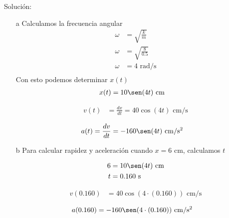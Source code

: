 \documentclass[letterpaper,12pt,addpoints]{exam}
\begin{document}
{\color{ceruleanblue}
Solución:\\
\begin{enumerate}
\item[a] Calculamos la frecuencia angular
\begin{align*}
\omega &= \sqrt{\frac{k}{m}}\\
\omega &= \sqrt{\frac{8}{0.5}}\\
\omega &= 4\,\,\mathrm{rad/s}\\
\end{align*}
Con esto podemos determinar $x(t)$
\begin{align*}
x(t) &= 10\sen(4 t)\,\,\mathrm{cm}
\end{align*}

\begin{minipage}[t]{0.5\textwidth}
\begin{align*}
v(t) &= \frac{dx}{dt}=40\cos(4t)\,\,\mathrm{cm/s}
\end{align*}
\begin{center}
\end{center}

\end{minipage}
\begin{minipage}[t]{0.5\textwidth}
\begin{align*}
a(t) &= \frac{dv}{dt}=-160\sen(4t)\,\,\mathrm{cm/s^2}
\end{align*}
\begin{center}
\end{center}
\end{minipage}

\item[b] Para calcular rapidez y aceleración cuando $x=6$ cm, calculamos $t$

\begin{align*}
6 &= 10\sen(4 t)\,\,\mathrm{cm}\\
t &= 0.160\,\,\mathrm{s}
\end{align*}

\begin{minipage}[t]{0.5\textwidth}
\begin{align*}
v(0.160) &=40\cos(4\cdot(0.160))\,\,\mathrm{cm/s}
\end{align*}
\begin{center}
\end{center}
\end{minipage}
\begin{minipage}[t]{0.5\textwidth}
\begin{align*}
a(0.160) &=-160\sen(4\cdot(0.160))\,\,\mathrm{cm/s^2}
\end{align*}
\begin{center}
\end{center}
\end{minipage}


\end{enumerate}}
\end{document}
